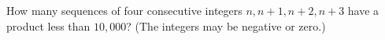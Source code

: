 How many sequences of four consecutive integers $n,n+1,n+2,n+3$ have a product less than $10{,}000$? (The integers may be negative or zero.)
